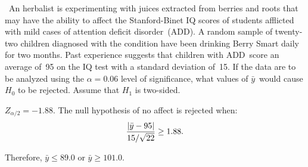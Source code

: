 \begin{problem}
  ~An herbalist is experimenting with juices extracted from berries and roots that may have the ability to affect the Stanford-Binet IQ scores of students afflicted with mild cases of attention deficit disorder~(ADD).  A random sample of twenty-two children diagnosed with the condition have been drinking Berry Smart daily for two months. Past experience suggests that children with ADD~score an average of~95 on the IQ test with a standard deviation of~15. If the data are to be analyzed using the ${\alpha =0.06}$ level of significance, what values of ${\bar{y}}$~would cause ${H_0}$ to be rejected.  Assume that $H_1$ is two-sided.
\end{problem}

\noindent
${Z_{\alpha / 2} = -1.88}$. The null hypothesis of no affect is rejected when:
\begin{equation*}
  \frac{\lvert\bar{y} - 95\rvert}{15 / \sqrt{22}} \geq 1.88\text{.}
\end{equation*}

\noindent
Therefore, ${\bar{y} \leq 89.0}$ or ${\bar{y} \geq 101.0}$.
